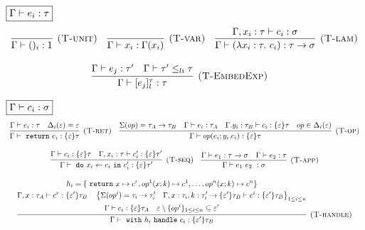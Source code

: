 \begin{figure}[t]
\footnotesize{
\noindent$\fbox{$\Gamma \vdash e_i : \tau$}$
\[
\begin{array}{c}

\infer[\textsc{(T-unit)}]
  {\Gamma \vdash ()_i : 1}
  {} \quad 

\infer[\textsc{(T-var)}]
  {\Gamma \vdash x_i : \Gamma(x_i)}
  {} \quad 

\infer[\textsc{(T-lam)}]
  {\Gamma \vdash (\lambda x_i: \tau.\ c_i) : \tau \rightarrow \sigma}
  {\Gamma, x_i:\tau \vdash c_i : \sigma} \\[3ex]
  
\infer[\textsc{(T-EmbedExp)}]
  {\Gamma \vdash [e_j]^\tau_l : \tau}
  {\Gamma \vdash e_j : \tau' & \Gamma \vdash \tau' \leq_{li} \tau} \quad  
\end{array} \\[3ex]
\]


\noindent$\fbox{$\Gamma \vdash c_i : \sigma$}$
\[
\begin{array}{c}

\infer[\textsc{(T-ret)}]
  {\Gamma\vdash \m{return} e_i : \{\varepsilon\}\tau }
  {\Gamma\vdash e_i : \tau & \Delta_i(\varepsilon) = \varepsilon} \quad 
  
\infer[\textsc{(T-op)}]
  {\Gamma\vdash op(e_i; y_i.c_i) : \{\varepsilon\}\tau }
  {\Sigma(op) = \tau_A \rightarrow \tau_B & \Gamma \vdash e_i : \tau_A & \Gamma. y_i:\tau_B\vdash c_i: \{\varepsilon\}\tau & op \in \Delta_i(\varepsilon)} \\[3ex]


\infer[\textsc{(T-seq)}]
  {\Gamma\vdash \m{do} x_i \leftarrow c_i \m{in} c_i' : \{\varepsilon\}\tau' }
  {\Gamma \vdash c_i : \{\varepsilon\}\tau & \Gamma, x_i:\tau \vdash c_i': \{\varepsilon\}\tau'} \quad 
  
  
\infer[\textsc{(T-app)}]
  {\Gamma\vdash e_1\ e_2\ : \sigma }
  {\Gamma \vdash e_1 : \tau \rightarrow \sigma & \Gamma \vdash e_2 : \tau} \\[3ex]
  
\infer[\textsc{(T-handle)}]
  {\Gamma\vdash \m{with} h_i \m{handle} c_i: \{\varepsilon'\} \tau_B}
  {\begin{gathered}
  h_i = \{\m{return} x \mapsto c^r, op^1(x;k) \mapsto c^1, \dots, op^n(x;k) \mapsto c^n \}\\
  \Gamma, x: \tau_A \vdash c^r : \{\varepsilon'\}\tau_B \quad
  \left\{ \Sigma(op^i) = \tau_i \rightarrow \tau_i'  \quad \Gamma, x:\tau_i, k:\tau_i' \rightarrow \{\varepsilon'\}\tau_B \vdash c^i: \{\varepsilon'\}\tau_B    \right\}_{1 \leq i \leq n} \\
  \Gamma \vdash c_i : \{\varepsilon\}\tau_A \quad \varepsilon \setminus \{op^i\}_{1 \leq i \leq n} \subseteq \varepsilon'
  \end{gathered}} \\[3ex]
  

\end{array}\]}
\end{figure}
